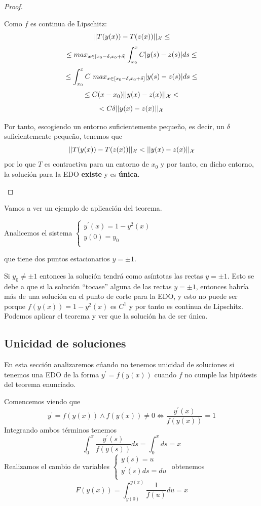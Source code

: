 \documentclass{mathnotes}
\begin{document}
\begin{proof}
\begin{enumerate}
Como $f$ es continua de Lipschitz:
$$||T(y(x)) - T(z(x))||_\mathcal{X} \leq $$
$$\leq max_{x\in [x_0-\delta, x_0+\delta]} \int_{x_0}^x C|y(s) - z(s)|ds \leq$$
$$\leq \int_{x_0}^x C\ max_{x\in [x_0-\delta, x_0+\delta]}\abs{y(s) - z(s)}ds \leq$$
$$\leq C(x-x_0)||y(x) - z(x)||_\mathcal{X} < $$
$$< C\delta ||y(x) - z(x)||_\mathcal{X}$$

Por tanto, escogiendo un entorno suficientemente pequeño, es decir, un $\delta$ suficientemente pequeño, tenemos que 
$$||T(y(x)) - T(z(x))||_\mathcal{X} < ||y(x) - z(x)||_\mathcal{X}$$
por lo que $T$ es contractiva para un entorno de $x_0$ y por tanto, en dicho entorno, la solución para la EDO \textbf{existe} y es \textbf{única}.
\end{enumerate}
\end{proof}

Vamos a ver un ejemplo de aplicación del teorema.

\begin{example}
Analicemos el sistema $\left\lbrace\begin{array}{l}y^\prime(x) = 1-y^2(x)\\y(0) = y_0\\\end{array}\right.$

que tiene dos puntos estacionarios $y=\pm1$.

Si $y_0\neq \pm1$ entonces la solución tendrá como asíntotas las rectas $y=\pm1$. Esto se debe a que si la solución ``tocase'' alguna de las rectas $y=\pm1$, entonces habría más de una solución en el punto de corte para la EDO, y esto no puede ser porque $f(y(x)) = 1-y^2(x)$ es $C^1$ y por tanto es continua de Lipschitz. Podemos aplicar el teorema y ver que la solución ha de ser única.
\end{example}

\subsection{Unicidad de soluciones}
En esta sección analizaremos cúando no tenemos unicidad de soluciones si tenemos una EDO de la forma $y^\prime = f(y(x))$ cuando $f$ no cumple las hipótesis del teorema enunciado.

Comencemos viendo que $$y^\prime = f(y(x)) \wedge f(y(x))\neq 0 \iff \frac{y^\prime(x)}{f(y(x))} = 1$$
Integrando ambos términos tenemos $$\int_0^x \frac{y^\prime(s)}{f(y(s))}ds = \int_0^x ds=x$$
Realizamos el cambio de variables
$\left\lbrace
  \begin{array}{l}
     y(s) = u \\
     y^\prime(s)ds = du  \\
  \end{array}
  \right.
$ obtenemos $$F(y(x)) = \int_{y(0)}^{y(x)} \frac{1}{f(u)}du = x$$
\end{document}
